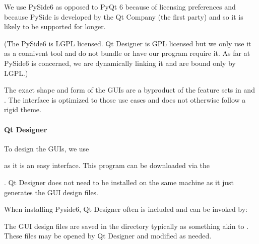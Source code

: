 \documentclass[letterpaper,11pt,english]{sphinxmanual}
\begin{document}
\sphinxAtStartPar
We use PySide6 as opposed to PyQt 6 because of licensing preferences and
because PySide is developed by the Qt Company (the first party) and so it is
likely to be supported for longer.

\sphinxAtStartPar
(The PySide6 is LGPL licensed. Qt Designer is GPL licensed but we only use it
as a connivent tool and do not bundle or have our program require it. As far
at PySide6 is concerned, we are dynamically linking it and are bound only by
LGPL.)

\sphinxAtStartPar
The exact shape and form of the GUIs are a byproduct of the feature sets in
{\hyperref[\detokenize{user/manual_mode:user-manual-mode}]{}} and {\hyperref[\detokenize{user/automatic_mode:user-automatic-mode}]{}}. The interface is
optimized to those use cases and does not otherwise follow a rigid theme.


\paragraph{Qt Designer}
\label{\detokenize{technical/architecture/graphical_user_interface:qt-designer}}
\sphinxAtStartPar
To design the GUIs, we use
%
\begin{footnote}[52]\sphinxAtStartFootnote
{}
%
\end{footnote} as it is an
easy interface. This program can be downloaded via the
%
\begin{footnote}[53]\sphinxAtStartFootnote
{}
%
\end{footnote}.
Qt Designer does not need to be installed on the same machine as it just
generates the GUI design files.

\sphinxAtStartPar
When installing Pyside6, Qt Designer often is included and can be invoked by:

\begin{sphinxVerbatim}[commandchars=\\\{\}]
\end{sphinxVerbatim}

\sphinxAtStartPar
The GUI design files are saved in the
 directory typically as
something akin to . These files may be opened by Qt Designer
and modified as needed.
\end{document}
